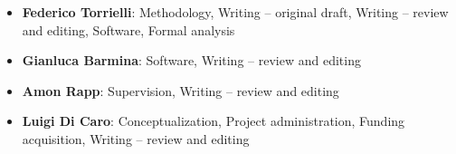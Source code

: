 \documentclass[preprint,12pt,authoryear]{elsarticle}
\begin{document}
\begin{itemize}
    \item \textbf{Federico Torrielli}: Methodology, Writing -- original draft, Writing -- review and editing, Software, Formal analysis
    \item \textbf{Gianluca Barmina}: Software, Writing -- review and editing
    \item \textbf{Amon Rapp}: Supervision, Writing -- review and editing
    \item \textbf{Luigi Di Caro}: Conceptualization, Project administration, Funding acquisition, Writing -- review and editing
\end{itemize}



\end{document}

